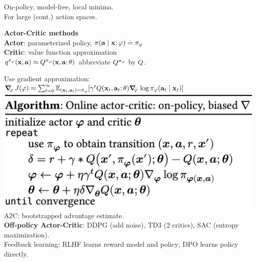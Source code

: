 On-policy, model-free, local minima. \\
For large (cont.) action spaces.
\begin{framed}
  \textbf{Actor-Critic methods} \\
  \textbf{Actor}: parameterized policy, $\pi(\mathbf{a} \mid \mathbf{x}; \mathbf{\varphi}) \overset{.}{=} \pi_{\mathbf{\varphi}}$ \\
  \textbf{Critic}: value function approximation \\
   $\q[\pi_\vvarphi]{\vx}{\va} \approx \Q[\pi_\vvarphi]{\vx}{\va; \vtheta}$ abbreviate $\fnQ[\pi_\vvarphi]$ by $\fnQ$.
\end{framed}
Use gradient approximation: 
{\tiny$\grad_\vvarphi \J{\vvarphi} \approx \sum_{t=0}^\infty\E[(\vx_t,\va_t) \sim \pi_\vvarphi]{\gamma^t \Q{\vx_t}{\va_t; \vtheta} \grad_\vvarphi \log \pi_\vvarphi(\va_t \mid \vx_t)}$}
\includegraphics[width=0.8\linewidth, trim={0 0 1cm 0}]{images/Online_actor_critic.png}
A2C: bootstrapped advantage estimate. \\
\textbf{Off-policy Actor-Critic}: DDPG (add noise), TD3 (2 critics), SAC (entropy maximization). \\
Feedback learning: RLHF learns reward model and policy; DPO learns policy directly.